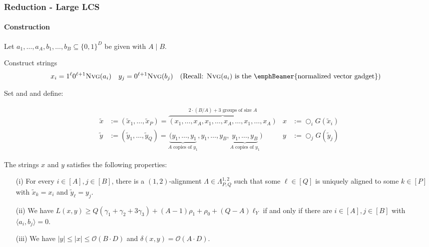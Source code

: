 \begin{frame}
\frametitle{Reduction - Large LCS}
\framesubtitle{Construction}

\begin{theorem}
Let  $a_1, \dots, a_A, b_1, \dots, b_B \subseteq \{0,1\}^D$ be given with $A \mid B$. 

Construct strings 
\begin{align*}
	x_i &= 1^\ell0^{\ell + 1}\nvg{a_i}&		y_j &= 0^{\ell +1}\nvg{b_j}			&&(\text{Recall: }\nvg{a_i} \text{ is the \emphBeamer{normalized vector gadget})}
\end{align*}


Set  and  and define:

\begin{align*}
\tilde{x} &:= (\tilde{x}_1, \ldots, \tilde{x}_P) = \overbrace{(x_1, \ldots, x_A, x_1, \ldots, x_A, \ldots, x_1, \ldots, x_A)}^{2 \cdot (B/A) + 3 \text{ groups of size } A} 	&	x &:= \bigcirc_i G(\tilde{x}_i)\\
%
\tilde{y} &:= (\tilde{y}_1, \ldots, \tilde{y}_Q) = \underbrace{(y_1, \ldots, y_1}_{A \text{ copies of } y_1}, y_1, \ldots, y_B, \underbrace{y_1, \ldots, y_B}_{A \text{ copies of } y_1})	&	y &:= \bigcirc_j G(\tilde{y}_j)
\end{align*}

The strings $x$ and $y$ satisfies the following properties:

\begin{itemize}
    \item[(i)] For every $i \in [A], j \in [B]$, there is a $(1,2)$-alignment $\Lambda \in \Lambda^{1,2}_{P,Q}$ such that some $\ell \in [Q]$ is uniquely aligned to some $k \in [P]$ with $\tilde{x}_k = x_i$ and $\tilde{y}_\ell = y_j$.

    \item[(ii)] We have $L(x,y) \geq Q(\gamma_1 + \gamma_2 + 3\gamma_3) + (A - 1)\rho_1 + \rho_0 + (Q - A)\ell_Y$ if and only if there are $i \in [A], j \in [B]$ with $\langle a_i, b_j \rangle = 0$.

    \item[(iii)] We have $|y| \leq |x| \leq \mathcal{O}(B \cdot D)$ and $\delta(x, y) = \mathcal{O}(A \cdot D)$.
\end{itemize}

\end{theorem}

\end{frame}